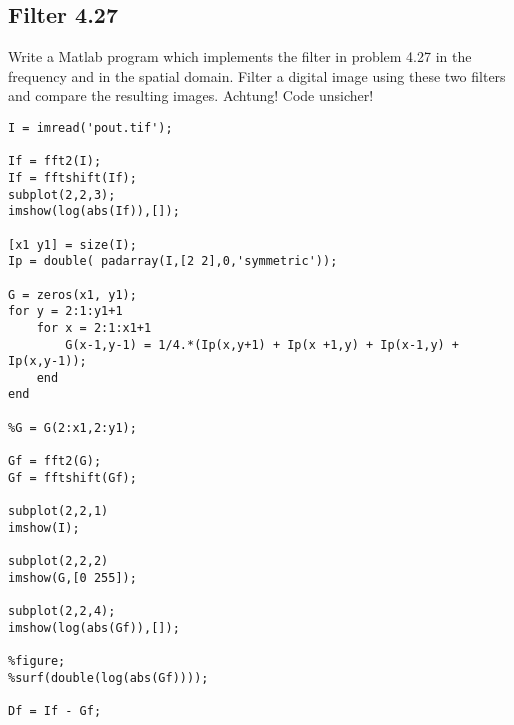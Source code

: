 


\subsection{Filter 4.27}
Write a Matlab program which implements the filter in problem 4.27 in the
frequency and in the spatial domain. Filter a digital image using these two filters and compare the resulting images.
Achtung! Code unsicher!
\begin{lstlisting}
I = imread('pout.tif');

If = fft2(I);
If = fftshift(If);
subplot(2,2,3);
imshow(log(abs(If)),[]);

[x1 y1] = size(I);
Ip = double( padarray(I,[2 2],0,'symmetric'));

G = zeros(x1, y1);
for y = 2:1:y1+1
    for x = 2:1:x1+1
        G(x-1,y-1) = 1/4.*(Ip(x,y+1) + Ip(x +1,y) + Ip(x-1,y) + Ip(x,y-1));
    end
end

%G = G(2:x1,2:y1);

Gf = fft2(G);
Gf = fftshift(Gf);

subplot(2,2,1)
imshow(I);

subplot(2,2,2)
imshow(G,[0 255]);

subplot(2,2,4);
imshow(log(abs(Gf)),[]);

%figure;
%surf(double(log(abs(Gf))));

Df = If - Gf;
\end{lstlisting}

